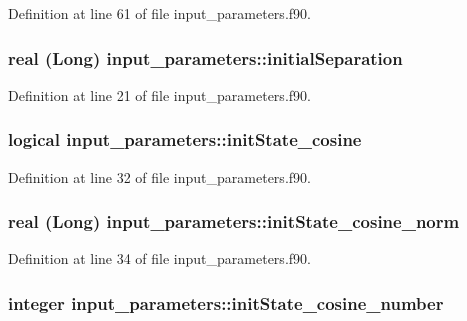 Definition at line 61 of file input\_\-parameters.f90.

\hypertarget{namespaceinput__parameters_a1d8bbaa8b473b798cb43170831cc57ac}{
\subsubsection[{initialSeparation}]{\setlength{\rightskip}{0pt plus 5cm}real (Long) {\bf input\_\-parameters::initialSeparation}}}
\label{namespaceinput__parameters_a1d8bbaa8b473b798cb43170831cc57ac}


Definition at line 21 of file input\_\-parameters.f90.

\hypertarget{namespaceinput__parameters_a794b8486b7ecd6258448887bce533681}{
\subsubsection[{initState\_\-cosine}]{\setlength{\rightskip}{0pt plus 5cm}logical {\bf input\_\-parameters::initState\_\-cosine}}}
\label{namespaceinput__parameters_a794b8486b7ecd6258448887bce533681}


Definition at line 32 of file input\_\-parameters.f90.

\hypertarget{namespaceinput__parameters_a51d2cc916f531fadef1a6f0729644174}{
\subsubsection[{initState\_\-cosine\_\-norm}]{\setlength{\rightskip}{0pt plus 5cm}real (Long) {\bf input\_\-parameters::initState\_\-cosine\_\-norm}}}
\label{namespaceinput__parameters_a51d2cc916f531fadef1a6f0729644174}


Definition at line 34 of file input\_\-parameters.f90.

\hypertarget{namespaceinput__parameters_ad5ff3d9c110be99ed08bbe970f1630c8}{
\subsubsection[{initState\_\-cosine\_\-number}]{\setlength{\rightskip}{0pt plus 5cm}integer {\bf input\_\-parameters::initState\_\-cosine\_\-number}}}
\label{namespaceinput__parameters_ad5ff3d9c110be99ed08bbe970f1630c8}


